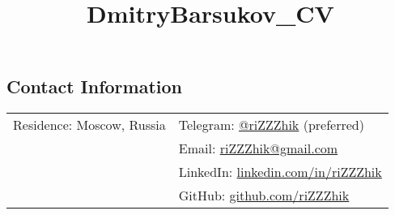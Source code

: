 \documentclass[margin,line]{res}
\begin{document}
\title{DmitryBarsukov_CV}

\begin{resume}

\section{\sc Contact Information}

\vspace{.05in}
\begin{tabular}{@{}p{2.30in}p{3in}}
Residence: Moscow, Russia
& Telegram: \href{https://t.me/riZZZhik}{@riZZZhik} (preferred) \\
& Email: \href{mailto:riZZZhik@gmail.com}{riZZZhik@gmail.com} \\
& LinkedIn: \href{https://linkedin.com/in/rizzzhik}{linkedin.com/in/riZZZhik} \\
& GitHub: \href{https://github.com/riZZZhik}{github.com/riZZZhik} \\
\end{tabular}





\end{resume}
\end{document}
